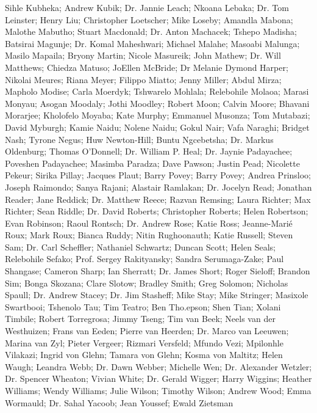     Sihle Kubheka;
    Andrew Kubik;
Dr. Jannie Leach;
    Nkoana Lebaka;
Dr. Tom Leinster;
    Henry Liu;
    Christopher Loetscher;
    Mike Loseby;
    Amandla Mabona;
    Malothe Mabutho;
    Stuart Macdonald;
Dr. Anton Machacek;
    Tshepo Madisha;
    Batsirai Magunje;
Dr. Komal Maheshwari;
    Michael Malahe;
    Masoabi Malunga;
    Masilo Mapaila;
    Bryony Martin;
    Nicole Masureik;
    John Mathew;
Dr. Will Matthews;
    Chiedza Matuso;
    JoEllen McBride;
    Dr Melanie Dymond Harper;
    Nikolai Meures;
    Riana Meyer;
    Filippo Miatto;
    Jenny Miller;
    Abdul Mirza;
    Mapholo Modise;
    Carla Moerdyk;
    Tshwarelo Mohlala;
    Relebohile Molaoa;
    Marasi Monyau;
    Asogan Moodaly;
    Jothi Moodley;
    Robert Moon;
    Calvin Moore;
    Bhavani Morarjee;
    Kholofelo Moyaba;
    Kate Murphy;
    Emmanuel Musonza;
    Tom Mutabazi;
    David Myburgh;
    Kamie Naidu;
    Nolene Naidu;
    Gokul Nair;
    Vafa Naraghi;
    Bridget Nash;
    Tyrone Negus;
    Huw Newton-Hill;
    Buntu Ngcebetsha;
Dr. Markus Oldenburg;
    Thomas O’Donnell;
Dr. William P. Heal;
Dr. Jaynie Padayachee;
    Poveshen Padayachee;
    Masimba Paradza;
    Dave Pawson;
    Justin Pead;
    Nicolette Pekeur;
    Sirika Pillay;
    Jacques Plaut;
    Barry Povey;
    Barry Povey;
    Andrea Prinsloo;
    Joseph Raimondo;
    Sanya Rajani;
    Alastair Ramlakan;
Dr. Jocelyn Read;
    Jonathan Reader;
    Jane Reddick;
Dr. Matthew Reece;
    Razvan Remsing;
    Laura Richter;
    Max Richter;
    Sean Riddle;
Dr. David Roberts;
    Christopher Roberts;
    Helen Robertson;
    Evan Robinson;
    Raoul Rontsch;
Dr. Andrew Rose;
    Katie Ross;
    Jeanne-Marié Roux;
    Mark Roux;
    Bianca Ruddy;
    Nitin Rughoonauth;
    Katie Russell;
    Steven Sam;
Dr. Carl Scheffler;
    Nathaniel Schwartz;
    Duncan Scott;
    Helen Seals;
    Relebohile Sefako;
    Prof. Sergey Rakityansky;
    Sandra Serumaga-Zake;
    Paul Shangase;
    Cameron Sharp;
    Ian Sherratt;
Dr. James Short;
    Roger Sieloff;
    Brandon Sim;
    Bonga Skozana;
    Clare Slotow;
    Bradley Smith;
    Greg Solomon;
    Nicholas Spaull;
Dr. Andrew Stacey;
Dr. Jim Stasheff;
    Mike Stay;
    Mike Stringer;
    Masixole Swartbooi;
    Tshenolo Tau;
    Tim Teatro;
    Ben Tho.epson;
    Shen Tian;
    Xolani Timbile;
    Robert Torregrosa;
    Jimmy Tseng;
    Tim van Beek;
    Neels van der Westhuizen;
    Frans van Eeden;
    Pierre van Heerden;
Dr. Marco van Leeuwen;
    Marina van Zyl;
    Pieter Vergeer;
    Rizmari Versfeld;
    Mfundo Vezi;
    Mpilonhle Vilakazi;
    Ingrid von Glehn;
    Tamara von Glehn;
    Kosma von Maltitz;
    Helen Waugh;
    Leandra Webb;
Dr. Dawn Webber;
    Michelle Wen;
Dr. Alexander Wetzler;
Dr. Spencer Wheaton;
    Vivian White;
Dr. Gerald Wigger;
    Harry Wiggins;
    Heather Williams;
    Wendy Williams;
    Julie Wilson;
    Timothy Wilson;
    Andrew Wood;
    Emma Wormauld;
Dr. Sahal Yacoob;
    Jean Youssef;
    Ewald Zietsman 






